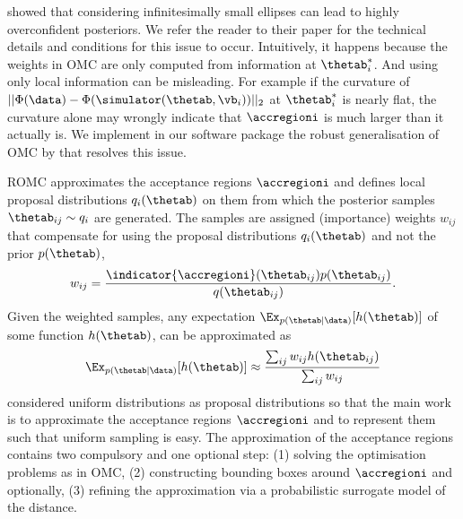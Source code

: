 \citet{Ikonomov2019} showed that considering infinitesimally small
ellipses can lead to highly overconfident posteriors. We refer the
reader to their paper for the technical details and conditions for
this issue to occur. Intuitively, it happens because the weights in
OMC are only computed from information at $\thetab_i^*$. And using
only local information can be misleading. For example if the curvature
of $||\Phi(\data)-\Phi(\simulator(\thetab, \vb_i))||_2$ at
$\thetab_i^*$ is nearly flat, the curvature alone may wrongly indicate
that $\accregioni$ is much larger than it actually is. We implement in
our software package the robust generalisation of OMC by
\citet{Ikonomov2019} that resolves this issue.

ROMC approximates the acceptance regions $\accregioni$ and defines
local proposal distributions $q_i(\thetab)$ on them from which the
posterior samples $\thetab_{ij} \sim q_i$ are generated. The samples
are assigned (importance) weights $w_{ij}$ that compensate for using
the proposal distributions $q_i(\thetab)$ and not the prior
$p(\thetab)$,
\begin{equation}
  w_{ij} = \frac{\indicator{\accregioni}(\thetab_{ij}) p(\thetab_{ij})}{q(\thetab_{ij})}.
  \label{eq:sampling}
\end{equation}
Given the weighted samples, any expectation
$\Ex_{p(\thetab|\data)}[h(\thetab)]$ of some function $h(\thetab)$, can be approximated as
\begin{equation} \label{eq:expectation}
  \Ex_{p(\thetab|\data)}[h(\thetab)] \approx \frac{\sum_{ij} w_{ij} h(\thetab_{ij})}{\sum_{ij} w_{ij}}
\end{equation}
\citet{Ikonomov2019} considered uniform distributions as proposal
distributions so that the main work is to approximate the acceptance
regions $\accregioni$ and to represent them such that uniform sampling
is easy. The approximation of the acceptance regions contains two
compulsory and one optional step: (1) solving the optimisation
problems as in OMC, (2) constructing bounding boxes around
$\accregioni$ and optionally, (3) refining the approximation via a
probabilistic surrogate model of the distance.
